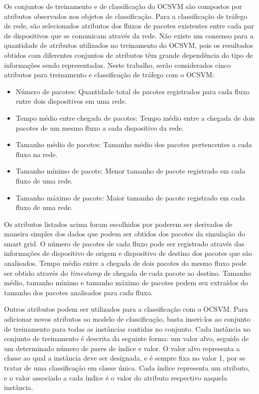 \documentclass[cic,tc]{iiufrgs}
\begin{document}
Os conjuntos de treinamento e de classificação do OCSVM são compostos por atributos observados nos objetos de classificação. Para a classificação de tráfego de rede, são selecionados atributos dos fluxos de pacotes existentes entre cada par de dispositivos que se comunicam através da rede. Não existe um consenso para a quantidade de atributos utilizados no treinamento do OCSVM, pois os resultados obtidos com diferentes conjuntos de atributos têm grande dependência do tipo de informações sendo representadas. Neste trabalho, serão considerados cinco atributos para treinamento e classificação de tráfego com o OCSVM:
\begin{itemize}
\item{Número de pacotes}: Quantidade total de pacotes registrados para cada fluxo entre dois dispositivos em uma rede.
\item{Tempo médio entre chegada de pacotes}: Tempo médio entre a chegada de dois pacotes de um mesmo fluxo a cada dispositivo da rede.
\item{Tamanho médio de pacotes}: Tamanho médio dos pacotes pertencentes a cada fluxo na rede.
\item{Tamanho mínimo de pacote}: Menor tamanho de pacote registrado em cada fluxo de uma rede.
\item{Tamanho máximo de pacote}: Maior tamanho de pacote registrado em cada fluxo de uma rede.
\end{itemize}
Os atributos listados acima foram escolhidos por poderem ser derivados de maneira simples dos dados que podem ser obtidos dos pacotes da simulação do smart grid. O número de pacotes de cada fluxo pode ser registrado através das informações de dispositivo de origem e dispositivo de destino dos pacotes que são analisados. Tempo médio entre a chegada de dois pacotes do mesmo fluxo pode ser obtido através do \emph{timestamp} de chegada de cada pacote ao destino. Tamanho médio, tamanho mínimo e tamanho máximo de pacotes podem sex extraídos do tamanho dos pacotes analisados para cada fluxo. 

Outros atributos podem ser utilizados para a classificação com o OCSVM. Para adicionar novos atributos ao modelo de classificação, basta inseri-los ao conjunto de treinamento para todas as instâncias contidas no conjunto. Cada instância no conjunto de treinamento é descrita da seguinte forma: um valor alvo, seguido de um determinado número de pares de índice e valor. O valor alvo representa a classe ao qual a instância deve ser designada, e é sempre fixa no valor 1, por se tratar de uma classificação em classe única. Cada índice representa um atributo, e o valor associado a cada índice é o valor do atributo respectivo naquela instância.
\end{document}
